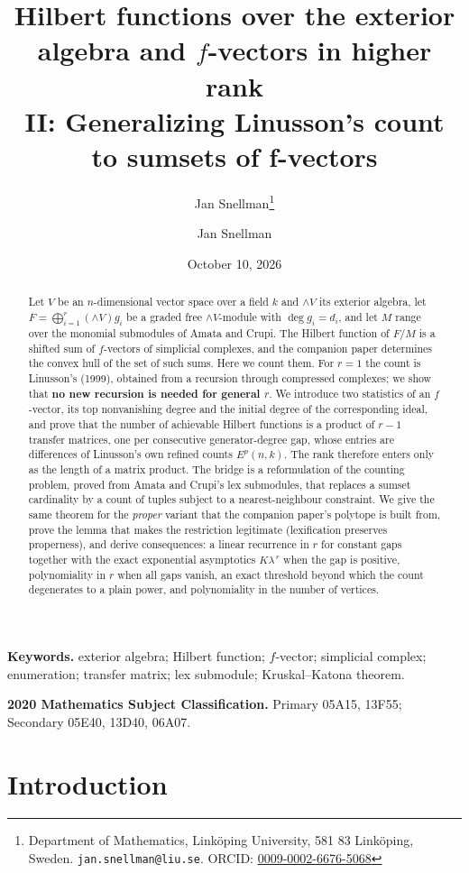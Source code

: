 \documentclass[11pt, a4paper, abstract=yes]{scrartcl}
\author{Jan Snellman\thanks{Department of Mathematics, Linköping University, 581 83 Linköping, Sweden. \texttt{jan.snellman@liu.se}. ORCID: \href{https://orcid.org/0009-0002-6676-5068}{0009-0002-6676-5068}}}
\author{Jan Snellman \orcidlink{0009-0002-6676-5068}}
\date{October 10, 2026}
\title{Hilbert functions over the exterior algebra and \(f\)-vectors in higher rank\\\medskip
\large II: Generalizing Linusson's count to sumsets of f-vectors}
\theoremstyle{definition}
\theoremstyle{remark}
\theoremstyle{plain}
\newcommand{\Ext}{\mathord{\wedge }V}
\let\autocite\cite
\begin{document}
\maketitle
\begin{abstract}
Let \(V\) be an \(n\)-dimensional vector space over a field \(k\) and \(\Ext\) its exterior algebra,
let \(F=\bigoplus_{i=1}^{r}(\Ext)g_i\) be a graded free \(\Ext\)-module with \(\deg g_i=d_i\), and let \(M\)
range over the monomial submodules of Amata and Crupi. The Hilbert function of \(F/M\) is a shifted
sum of \(f\)-vectors of simplicial complexes, and the companion paper \autocite{SnellmanArticle1} determines the convex hull of the
set of such sums. Here we count them. For \(r=1\) the count is Linusson's (1999), obtained from a
recursion through compressed complexes; we show that \textbf{no new recursion is needed for general
\(r\)}. We introduce two statistics of an \(f\)-vector, its top nonvanishing degree and the initial
degree of the corresponding ideal, and prove that the number of achievable Hilbert functions is a
product of \(r-1\) transfer matrices, one per consecutive generator-degree gap, whose entries are
differences of Linusson's own refined counts \(E^p(n,k)\). The rank therefore enters only as the
length of a matrix product. The bridge is a reformulation of the counting problem, proved from
Amata and Crupi's lex submodules, that replaces a sumset cardinality by a count of tuples subject to
a nearest-neighbour constraint. We give the same theorem for the \emph{proper} variant that the companion
paper's polytope is built from, prove the lemma that makes the restriction legitimate (lexification
preserves properness), and derive consequences: a linear recurrence in \(r\) for
constant gaps together with the exact exponential asymptotics \(K\lambda^{\,r}\) when the gap is
positive, polynomiality in \(r\) when all gaps vanish, an exact threshold beyond which the count
degenerates to a plain power, and polynomiality in the number of vertices.
\end{abstract}

\medskip\noindent\textbf{Keywords.} exterior algebra; Hilbert function; \(f\)-vector; simplicial
complex; enumeration; transfer matrix; lex submodule; Kruskal--Katona theorem.

\smallskip\noindent\textbf{2020 Mathematics Subject Classification.} Primary 05A15, 13F55;
Secondary 05E40, 13D40, 06A07.
\medskip

\setcounter{tocdepth}{2}
\tableofcontents
\section{Introduction}
\label{sec-intro}
\end{document}

